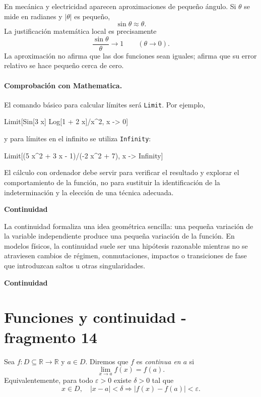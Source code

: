 \begin{example}
En mecánica y electricidad aparecen aproximaciones de pequeño ángulo. Si $\theta$ se mide en radianes y $|\theta|$ es pequeño,
\[
\sin\theta\approx\theta.
\]
La justificación matemática local es precisamente
\[
\frac{\sin\theta}{\theta}\longrightarrow1
\qquad(\theta\to0).
\]
La aproximación no afirma que las dos funciones sean iguales; afirma que su error relativo se hace pequeño cerca de cero.
\end{example}

\paragraph{Comprobación con Mathematica.}
El comando básico para calcular límites será \texttt{Limit}. Por ejemplo,
\begin{mathematicacode}
Limit[Sin[3 x] Log[1 + 2 x]/x^2, x -> 0]
\end{mathematicacode}
y para límites en el infinito se utiliza \texttt{Infinity}:
\begin{mathematicacode}
Limit[(5 x^2 + 3 x - 1)/(-2 x^2 + 7), x -> Infinity]
\end{mathematicacode}
El cálculo con ordenador debe servir para verificar el resultado y explorar el comportamiento de la función, no para sustituir la identificación de la indeterminación y la elección de una técnica adecuada.

\textbf{Continuidad}

La continuidad formaliza una idea geométrica sencilla: una pequeña variación de la variable independiente produce una pequeña variación de la función. En modelos físicos, la continuidad suele ser una hipótesis razonable mientras no se atraviesen cambios de régimen, conmutaciones, impactos o transiciones de fase que introduzcan saltos u otras singularidades.

\textbf{Continuidad}


\section{Funciones y continuidad - fragmento 14}
\begin{definition}[Continuidad]
Sea $f:D\subseteq\mathbb{R}\to\mathbb{R}$ y $a\in D$. Diremos que $f$ es \emph{continua en $a$} si
\[
\lim_{x\to a}f(x)=f(a).
\]
Equivalentemente, para todo $\varepsilon>0$ existe $\delta>0$ tal que
\[
x\in D,\quad |x-a|<\delta
\Longrightarrow
|f(x)-f(a)|<\varepsilon.
\]
\end{definition}

